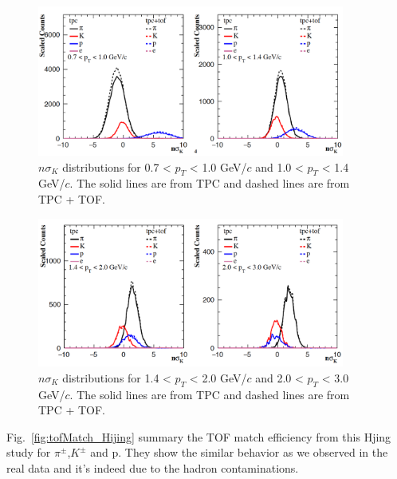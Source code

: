 \begin{figure}[htbp]
\centering
\includegraphics[keepaspectratio,width=0.9\textwidth,angle=-0]{figure/Run14_D0HFT/tofMatch_Hijing_nSigmaK_new_1.png}
\caption{$n\sigma_{K}$ distributions for 0.7 < $p_T$ < 1.0 GeV/$c$ and 1.0 < $p_T$ < 1.4 GeV/$c$. The solid lines are from TPC and dashed lines are from TPC + TOF.}
\label{fig:tpck1}
\end{figure}

\begin{figure}[htbp]
\centering
\includegraphics[keepaspectratio,width=0.9\textwidth,angle=-0]{figure/Run14_D0HFT/tofMatch_Hijing_nSigmaK_new_2.png}
\caption{$n\sigma_{K}$ distributions for 1.4 < $p_T$ < 2.0 GeV/$c$ and 2.0 < $p_T$ < 3.0 GeV/$c$. The solid lines are from TPC and dashed lines are from TPC + TOF.}
\label{fig:tpck2}
\end{figure}

Fig.~\ref{fig:tofMatch_Hijing} summary the TOF match efficiency from this Hjing study for $\pi^{\pm}$,$K^{\pm}$ and p. They show the similar behavior as we observed in the real data and it's indeed due to the hadron contaminations. 


